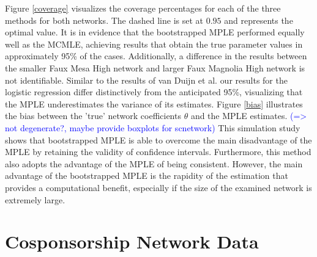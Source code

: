 \documentclass[headsepline=true, abstracton]{scrartcl}
\begin{document}
\noindent Figure \ref{coverage} visualizes the coverage percentages for each of the three methods for both networks. The dashed line is set at $0.95$ and represents the optimal value. It is in evidence that the bootstrapped MPLE performed equally well as the MCMLE, achieving results that obtain the true parameter values in approximately 95\% of the cases. Additionally, a difference in the results between the smaller Faux Mesa High network and larger Faux Magnolia High network is not identifiable. Similar to the results of van Duijn et al. \cite{vanDuijnetal2009} our results for the logistic regression differ distinctively from the anticipated 95\%, visualizing that the MPLE underestimates the variance of its estimates.
Figure \ref{bias} illustrates the bias between the 'true' network coefficients $\theta$ and the MPLE estimates. \textcolor{blue}{(=> not degenerate?, maybe provide boxplots for scnetwork)}
\noindent This simulation study shows that bootstrapped MPLE is able to overcome the main disadvantage of the MPLE by retaining the validity of confidence intervals. Furthermore, this method also adopts the advantage of the MPLE of being consistent. However, the main advantage of the bootstrapped MPLE is the rapidity of the estimation that provides a computational benefit, especially if the size of the examined network is extremely large.

\section*{Cosponsorship Network Data}
\end{document}
